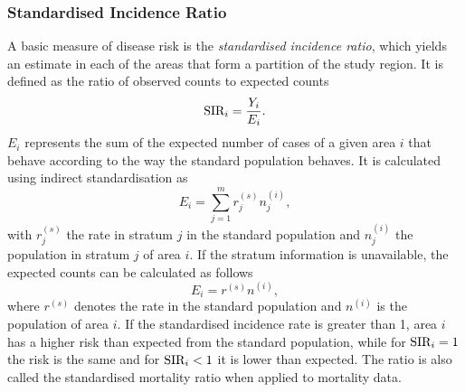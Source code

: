 \subsubsection{Standardised Incidence Ratio}
A basic measure of disease risk is the \textit{standardised incidence ratio}, which yields an estimate in each of the areas that form a partition of the study region. It is defined as the ratio of observed counts to expected counts
\begin{equation}
    \hbox{SIR}_i = \frac{Y_i}{E_i}.
\end{equation}
$E_i$ represents the sum of the expected number of cases of a given area $i$ that behave according to the way the standard population behaves. It is calculated using indirect standardisation as
\begin{equation}
    E_i=\sum_{j=1}^mr_j^{(s)}n_j^{(i)},
\end{equation}
with $r_j^{(s)}$ the rate in stratum $j$ in the standard population and $n_j^{(i)}$ the population in stratum $j$ of area $i$. If the stratum information is unavailable, the expected counts can be calculated as follows
\begin{equation*}
    E_i = r^{(s)}n^{(i)},
\end{equation*}
where $r^{(s)}$ denotes the rate in the standard population and $n^{(i)}$ is the population of area $i$. If the standardised incidence rate is greater than 1, area $i$ has a higher risk than expected from the standard population, while for $\hbox{SIR}_i = 1$ the risk is the same and for $\hbox{SIR}_i < 1$ it is lower than expected. The ratio is also called the standardised mortality ratio when applied to mortality data.
